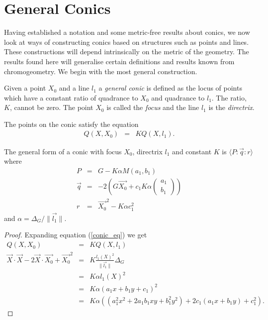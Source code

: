 \section{General Conics}

Having established a notation and some metric-free results about conics, we now look at ways of constructing conics based on structures such as points and lines.
These constructions will depend intrinsically on the metric of the geometry.
The results found here will generalise certain definitions and results known from chromogeometry.
We begin with the most general construction.

\begin{definition} Given a point $X_0$ and a line $l_1$ a \emph{general conic} is defined as the locus of points which have a constant ratio of quadrance to $X_0$ and quadrance to $l_1$. 
The ratio, $K$, cannot be zero. 
The point $X_0$ is called the \emph{focus} and the line $l_1$ is the \emph{directrix}.

The points on the conic satisfy the equation
\begin{eqnarray}
Q(X, X_0) & = & KQ(X, l_1).\label{conic_eq}
\end{eqnarray}

\end{definition}

\begin{theorem}
The general form of a conic with focus $X_0$, directrix $l_1$ and constant $K$ is $\langle P\!:\!\vec{q}\!:\!r \rangle$ where
\begin{eqnarray}
P & = & G - K\alpha M(a_1, b_1)\label{conic_P}\\
\vec{q} & = & -2\left(G\vec{X_0} + c_1K\alpha\begin{pmatrix}a_1 \\ b_1\end{pmatrix}\right)\label{conic_q}\\
r & = & \vec{X_0}^2 - K\alpha c_1^2\label{conic_r}
\end{eqnarray}
and $\alpha = \Delta_G/\|\vec{l_1}\|$.

\end{theorem}
\begin{proof}
Expanding equation (\ref{conic_eq}) we get
\begin{eqnarray}
Q(X, X_0) & = & KQ(X, l_1)\nonumber\\
\vec{X}\cdot\vec{X} -2\vec{X}\cdot\vec{X_0} + \vec{X_0}^2 & = & K\frac{l_1(X)^2}{\|\vec{l_1}\|}\Delta_G\nonumber\\
 & = & K\alpha l_1(X)^2\nonumber\\
 & = & K\alpha(a_1x + b_1y + c_1)^2\nonumber\\
 & = & K\alpha((a_1^2x^2  + 2a_1b_1xy + b_1^2y^2) + 2c_1(a_1x + b_1y) + c_1^2).\nonumber
\end{eqnarray}
\end{proof}

